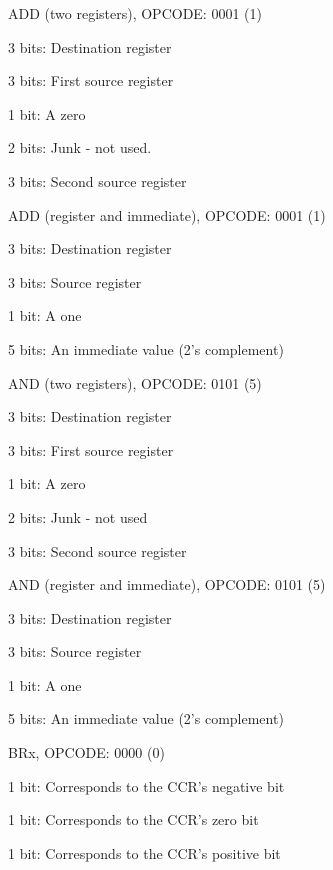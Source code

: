 \begin{DoxyItemize}
\item ADD (two registers), OPCODE: 0001 (1) 
\begin{DoxyItemize}
\item 3 bits: Destination register 
\item 3 bits: First source register 
\item 1 bit: A zero 
\item 2 bits: Junk -\/ not used. 
\item 3 bits: Second source register 
\end{DoxyItemize}\item ADD (register and immediate), OPCODE: 0001 (1) 
\begin{DoxyItemize}
\item 3 bits: Destination register 
\item 3 bits: Source register 
\item 1 bit: A one 
\item 5 bits: An immediate value (2's complement) 
\end{DoxyItemize}\item AND (two registers), OPCODE: 0101 (5) 
\begin{DoxyItemize}
\item 3 bits: Destination register 
\item 3 bits: First source register 
\item 1 bit: A zero 
\item 2 bits: Junk -\/ not used 
\item 3 bits: Second source register 
\end{DoxyItemize}\item AND (register and immediate), OPCODE: 0101 (5) 
\begin{DoxyItemize}
\item 3 bits: Destination register 
\item 3 bits: Source register 
\item 1 bit: A one 
\item 5 bits: An immediate value (2's complement) 
\end{DoxyItemize}\item BRx, OPCODE: 0000 (0) 
\begin{DoxyItemize}
\item 1 bit: Corresponds to the CCR's negative bit 
\item 1 bit: Corresponds to the CCR's zero bit 
\item 1 bit: Corresponds to the CCR's positive bit 

\end{DoxyItemize}
\end{DoxyItemize}
